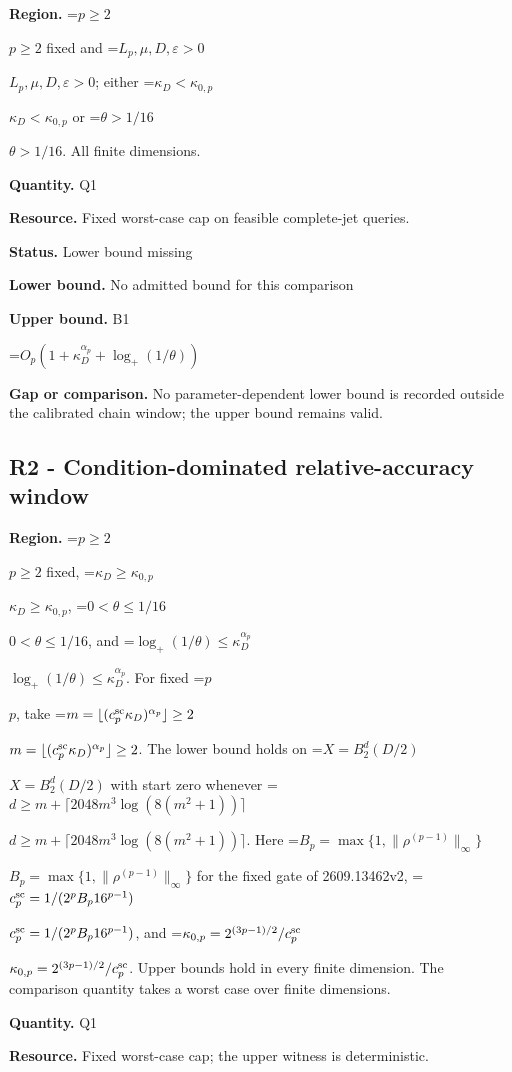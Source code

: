 \documentclass[10pt,a4paper]{article}
\newcommand{\AtlasMath}[1]{\par\begingroup\centering\setbox0=\hbox{$\displaystyle #1$}\ifdim\wd0>1.4\linewidth\typeout{ATLAS WIDE FORMULA: \the\wd0}\fi\ifdim\wd0>\linewidth\resizebox{\linewidth}{!}{\box0}\else\box0\fi\par\endgroup}
\newcommand{\AtlasInlineMath}[1]{\begingroup\setbox0=\hbox{$#1$}\ifdim\wd0>.4\linewidth\endgroup\AtlasMath{#1}\else\endgroup$#1$\fi}
\begin{document}
\textbf{Region.} \AtlasInlineMath{p\ge2} fixed and \AtlasInlineMath{L_p,\mu,D,\varepsilon>0}; either \AtlasInlineMath{\kappa_D<\kappa_{0,p}} or \AtlasInlineMath{\theta>1/16}. All finite dimensions.



\textbf{Quantity.} Q1



\textbf{Resource.} Fixed worst-case cap on feasible complete-jet queries.



\textbf{Status.} Lower bound missing



\textbf{Lower bound.} No admitted bound for this comparison



\textbf{Upper bound.} B1



\AtlasMath{O_p\!\left(1+\kappa_D^{\alpha_p}+\log_+(1/\theta)\right)}


\textbf{Gap or comparison.} No parameter-dependent lower bound is recorded outside the calibrated chain window; the upper bound remains valid.



\subsection{R2 - Condition-dominated relative-accuracy window}


\textbf{Region.} \AtlasInlineMath{p\ge2} fixed, \AtlasInlineMath{\kappa_D\ge\kappa_{0,p}}, \AtlasInlineMath{0<\theta\le1/16}, and \AtlasInlineMath{\log_+(1/\theta)\le\kappa_D^{\alpha_p}}. For fixed \AtlasInlineMath{p}, take \AtlasInlineMath{m=\lfloor(c_p^{\rm sc}\kappa_D)^{\alpha_p}\rfloor\ge2}. The lower bound holds on \AtlasInlineMath{X=B_2^d(D/2)} with start zero whenever \AtlasInlineMath{d\ge m+\lceil2048m^3\log(8(m^2+1))\rceil}. Here \AtlasInlineMath{B_p=\max\{1,\|\rho^{(p-1)}\|_\infty\}} for the fixed gate of 2609.13462v2, \AtlasInlineMath{c_p^{\rm sc}=1/(2^pB_p16^{p-1})}, and \AtlasInlineMath{\kappa_{0,p}=2^{(3p-1)/2}/c_p^{\rm sc}}. Upper bounds hold in every finite dimension. The comparison quantity takes a worst case over finite dimensions.



\textbf{Quantity.} Q1



\textbf{Resource.} Fixed worst-case cap; the upper witness is deterministic.
\end{document}
